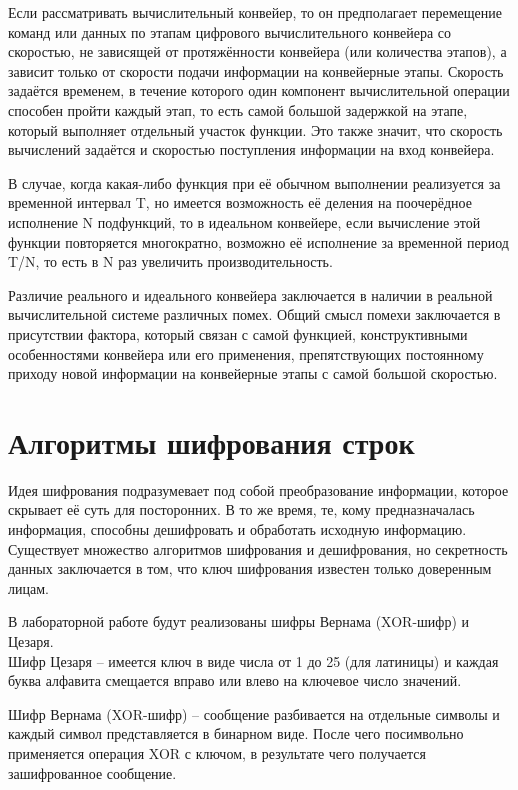 \documentclass[12pt,a4paper]{report}
\begin{document}
Если рассматривать вычислительный конвейер, то он предполагает перемещение команд или данных по этапам цифрового 
вычислительного конвейера со скоростью, не зависящей от протяжённости конвейера (или количества этапов), а 
зависит только от скорости подачи информации на конвейерные этапы. 
Скорость задаётся временем, в течение которого один компонент вычислительной операции способен пройти каждый этап, 
то есть самой большой задержкой на этапе, который выполняет отдельный участок функции. Это также значит, что скорость 
вычислений задаётся и скоростью поступления информации на вход конвейера.

В случае, когда какая-либо функция при её обычном выполнении реализуется за временной интервал T, но имеется 
возможность её деления на поочерёдное исполнение N подфункций, то в идеальном конвейере, если вычисление этой функции 
повторяется многократно, возможно её исполнение за временной период T/N, то есть в N раз увеличить производительность.

Различие реального и идеального конвейера заключается в наличии в реальной вычислительной системе различных помех.
Общий смысл помехи заключается в присутствии фактора, который связан с самой функцией, конструктивными особенностями 
конвейера или его применения, препятствующих постоянному приходу новой информации на конвейерные этапы с самой большой 
скоростью.

\section{Алгоритмы шифрования строк}

Идея шифрования подразумевает под собой преобразование информации, которое скрывает её суть для посторонних. 
В то же время, те, кому предназначалась информация, способны дешифровать и обработать исходную информацию.
Существует множество алгоритмов шифрования и дешифрования, но секретность данных заключается в том, что ключ 
шифрования известен только доверенным лицам.

В лабораторной работе будут реализованы шифры Вернама (XOR-шифр) и Цезаря.\\

Шифр Цезаря -- имеется ключ в виде числа от 1 до 25 (для латиницы) и каждая буква алфавита смещается вправо или 
влево на ключевое число значений.

Шифр Вернама (XOR-шифр) -- сообщение разбивается на отдельные символы и каждый символ представляется в бинарном 
виде.
После чего посимвольно применяется операция XOR с ключом, в результате чего получается зашифрованное сообщение.
\end{document}
